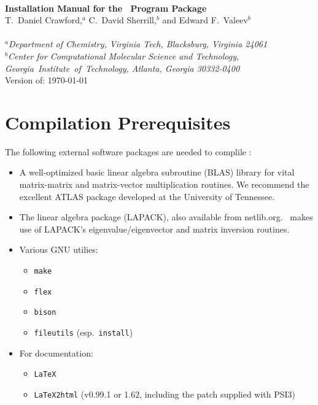 \documentclass[12pt]{article}
\begin{document}


\begin{center}
\ \\
\vspace{2.0in}
{\bf {\Large Installation Manual for the \PSIthree\ Program Package}} \\
\vspace{0.5in}
T.\ Daniel Crawford,$^a$ C.\ David Sherrill,$^b$ and Edward F.\ Valeev$^b$ \\
\ \\
{\em $^a$Department of Chemistry, Virginia Tech, Blacksburg, Virginia 24061} \\
\vspace{0.1in}
{\em $^b$Center for Computational Molecular Science and Technology, \mbox{Georgia 
Institute of Technology,} Atlanta, Georgia 30332-0400} 
\ \\
\vspace{0.3in}
Version of: \today
\end{center}

\thispagestyle{empty}

\newpage
\section{Compilation Prerequisites}

The following external software packages are needed to complile \PSIthree:
\begin{itemize}
\item A well-optimized basic linear algebra subroutine (BLAS) library
  for vital matrix-matrix and matrix-vector multiplication routines.
  We recommend the excellent ATLAS package developed at the University
  of Tennessee.  
\item The linear algebra package (LAPACK), also available from
  netlib.org.  \PSIthree\ makes use of LAPACK's eigenvalue/eigenvector
  and matrix inversion routines.  
\item Various GNU utilies: 
\begin{itemize}
\item {\tt make}
\item {\tt flex}
\item {\tt bison}
\item {\tt fileutils} (esp.\ {\tt install})
\end{itemize}
\item For documentation:
\begin{itemize}
\item {\tt LaTeX}
\item {\tt LaTeX2html} (v0.99.1 or 1.62, including the patch supplied with PSI3)
\end{itemize}
\end{itemize}
\end{document}
